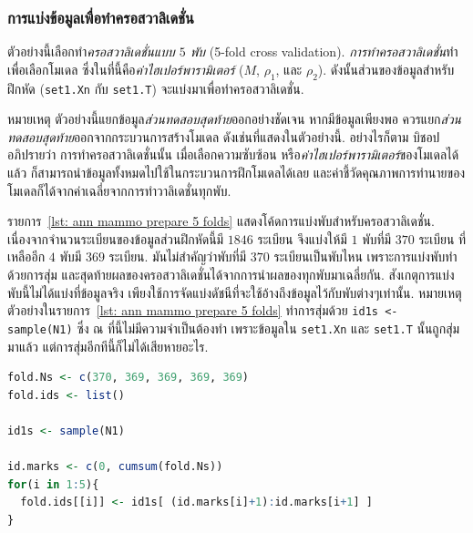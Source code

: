\subsubsection{การแบ่งข้อมูลเพื่อทำครอสวาลิเดชั่น}

ตัวอย่างนี้เลือกทำ\textit{ครอสวาลิเดชั่นแบบ $5$ พับ} (5-fold cross validation).
\textit{การทำครอสวาลิเดชั่น}ทำเพื่อเลือกโมเดล ซึ่งในที่นี้คือ\textit{ค่าไฮเปอร์พารามิเตอร์} ($M$, $\rho_1$, และ $\rho_2$).
ดังนั้นส่วนของข้อมูลสำหรับฝึกหัด (\texttt{set1.Xn} กับ \texttt{set1.T}) จะแบ่งมาเพื่อทำครอสวาลิเดชั่น.

หมายเหตุ
%
ตัวอย่างนี้แยกข้อมูล\textit{ส่วนทดสอบสุดท้าย}ออกอย่างชัดเจน
หากมีข้อมูลเพียงพอ ควรแยก\textit{ส่วนทดสอบสุดท้าย}ออกจากกระบวนการสร้างโมเดล ดังเช่นที่แสดงในตัวอย่างนี้.
อย่างไรก็ตาม บิชอป\cite{Bishop2006a}อภิปรายว่า
การทำครอสวาลิเดชั่นนั้น 
เมื่อเลือกความซับซ้อน หรือ\textit{ค่าไฮเปอร์พารามิเตอร์}ของโมเดลได้แล้ว
ก็สามารถนำข้อมูลทั้งหมดไปใช้ในกระบวนการฝึกโมเดลได้เลย
และค่าชี้วัดคุณภาพการทำนายของโมเดลก็ได้จากค่าเฉลี่ยจากการทำวาลิเดชั่นทุกพับ.


รายการ~\ref{lst: ann mammo prepare 5 folds} แสดงโค้ดการแบ่งพับสำหรับครอสวาลิเดชั่น.
เนื่องจากจำนวนระเบียนของข้อมูลส่วนฝึกหัดนี้มี $1846$ ระเบียน 
จึงแบ่งให้มี $1$ พับที่มี $370$ ระเบียน ที่เหลืออีก $4$ พับมี $369$ ระเบียน.
มันไม่สำคัญว่าพับที่มี $370$ ระเบียนเป็นพับไหน เพราะการแบ่งพับทำด้วยการสุ่ม และสุดท้ายผลของครอสวาลิเดชั่นได้จากการนำผลของทุกพับมาเฉลี่ยกัน.
สังเกตุการแบ่งพับนี้ไม่ได้แบ่งที่ข้อมูลจริง เพียงใช้การจัดแบ่งดัชนีที่จะใช้อ้างถึงข้อมูลไว้กับพับต่างๆเท่านั้น.
หมายเหตุ ตัวอย่างในรายการ~\ref{lst: ann mammo prepare 5 folds} ทำการสุ่มด้วย \texttt{id1s <- sample(N1)} ซึ่ง ณ ที่นี้ไม่มีความจำเป็นต้องทำ เพราะข้อมูลใน \texttt{set1.Xn} และ \texttt{set1.T} นั้นถูกสุ่มมาแล้ว
แต่การสุ่มอีกทีนี้ก็ไม่ได้เสียหายอะไร.

\begin{lstlisting}[language=R,caption={ตัวอย่างโค้ดการแบ่งพับสำหรับครอสวาลิเดชั่น},label={lst: ann mammo prepare 5 folds}]
fold.Ns <- c(370, 369, 369, 369, 369)
fold.ids <- list()

id1s <- sample(N1)

id.marks <- c(0, cumsum(fold.Ns))
for(i in 1:5){
  fold.ids[[i]] <- id1s[ (id.marks[i]+1):id.marks[i+1] ]
}
\end{lstlisting}


